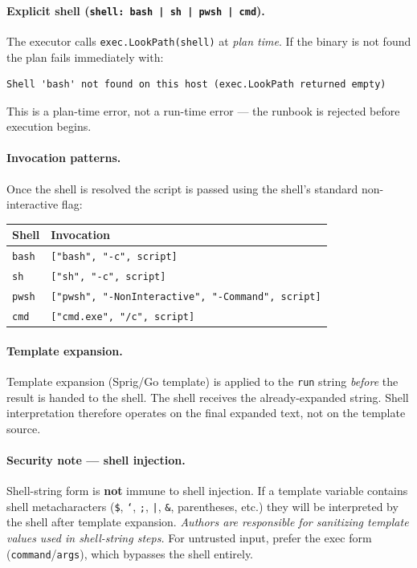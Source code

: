 \paragraph{Explicit shell (\texttt{shell: bash | sh | pwsh | cmd}).}
The executor calls \texttt{exec.LookPath(shell)} at \emph{plan time}.  If the binary
is not found the plan fails immediately with:

\begin{verbatim}
Shell 'bash' not found on this host (exec.LookPath returned empty)
\end{verbatim}

This is a plan-time error, not a run-time error — the runbook is rejected before
execution begins.

\paragraph{Invocation patterns.}
Once the shell is resolved the script is passed using the shell's standard
non-interactive flag:

\begin{center}
\begin{tabular}{|l|l|}
\hline
\textbf{Shell} & \textbf{Invocation} \\
\hline
\texttt{bash} & \texttt{["bash", "-c", script]} \\
\texttt{sh}   & \texttt{["sh", "-c", script]} \\
\texttt{pwsh} & \texttt{["pwsh", "-NonInteractive", "-Command", script]} \\
\texttt{cmd}  & \texttt{["cmd.exe", "/c", script]} \\
\hline
\end{tabular}
\end{center}

\paragraph{Template expansion.}
Template expansion (Sprig/Go template) is applied to the \texttt{run} string
\emph{before} the result is handed to the shell.  The shell receives the
already-expanded string.  Shell interpretation therefore operates on the final
expanded text, not on the template source.

\paragraph{Security note — shell injection.}
Shell-string form is \textbf{not} immune to shell injection.  If a template variable
contains shell metacharacters (\texttt{\$}, \texttt{`}, \texttt{;}, \texttt{|},
\texttt{\&}, parentheses, etc.) they will be interpreted by the shell after template
expansion.  \emph{Authors are responsible for sanitizing template values used in
shell-string steps.}  For untrusted input, prefer the exec form
(\texttt{command}/\texttt{args}), which bypasses the shell entirely.

